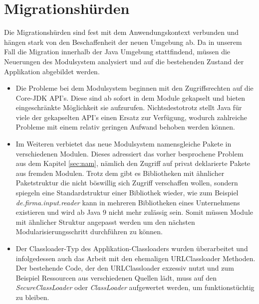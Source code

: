 \section{Migrationshürden} \label{MigH}

	Die Migrationshürden sind fest mit dem Anwendungskontext verbunden und hängen stark von den Beschaffenheit der neuen Umgebung ab. Da in unserem Fall die Migration innerhalb der Java Umgebung stattfindend, müssen die Neuerungen des Modulsystem analysiert und auf die bestehenden Zustand der Applikation abgebildet werden.\bigbreak

\begin{itemize}
	\item Die Probleme bei dem Modulsystem beginnen mit den Zugriffsrechten auf die Core-JDK API's. Diese sind ab sofort in dem Module gekapselt und bieten eingeschränkte Möglichkeit sie aufzurufen. Nichtsdestotrotz stellt Java für viele der gekapselten API's einen Ersatz zur Verfügung, wodurch zahlreiche Probleme mit einem relativ geringen Aufwand behoben werden können. \cite{masteringJava9,modulProgJava9,modulMitJava9,javaMod9} 


	\item Im Weiteren verbietet das neue Modulsystem namensgleiche Pakete in verschiedenen Modulen. Dieses adressiert das vorher besprochene Problem aus dem Kapitel \ref{sec:nam}, nämlich den Zugriff auf privat deklarierte Pakete aus fremden Modulen. Trotz dem gibt es Bibliotheken mit ähnlicher Paketstruktur die nicht böswillig sich Zugriff verschaffen wollen, sondern spiegeln eine Standardstruktur einer Bibliothek wieder, wie zum Beispiel \textit{de.firma.input.reader} kann in mehreren Bibliotheken eines Unternehmens existieren und wird ab Java 9 nicht mehr zulässig sein. Somit müssen Module mit ähnlicher Struktur angepasst werden um den nächsten Modularisierungsschritt durchführen zu können. \cite{masteringJava9,modulProgJava9,modulMitJava9,javaMod9} 


	\item Der Classloader-Typ des Applikation-Classloaders wurden überarbeitet und infolgedessen auch das Arbeit mit den ehemaligen URLClassloader Methoden. Der bestehende Code, der den URLClassloader exzessiv nutzt und zum Beispiel Ressourcen aus verschiedenen Quellen lädt, muss auf den \textit{SecureClassLoader} oder  \textit{ClassLoader} aufgewertet werden, um funktionstüchtig zu bleiben. \cite{oracModClassLoader} 



\end{itemize}
